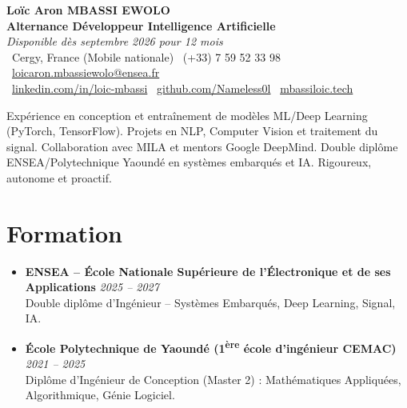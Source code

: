 \documentclass[a4paper,11pt]{article}
\begin{document}
\begin{center}
    {\Large \textbf{Loïc Aron MBASSI EWOLO}} \\ \vspace{4pt}
    \textbf{\large Alternance Développeur Intelligence Artificielle} \\
    \textit{\small Disponible dès septembre 2026 pour 12 mois} \\ \vspace{4pt}
    \small
    \faMapMarker\ Cergy, France (Mobile nationale) \quad
    \faPhone\ (+33) 7 59 52 33 98 \quad
    {\color{primary}\faEnvelope\ \href{mailto:loicaron.mbassiewolo@ensea.fr}{loicaron.mbassiewolo@ensea.fr}} \\ \vspace{2pt}
    {\color{primary}\faLinkedin\ \href{https://www.linkedin.com/in/loic-mbassi/}{linkedin.com/in/loic-mbassi}} \quad
    {\color{primary}\faGithub\ \href{https://github.com/Nameless0l}{github.com/Nameless0l}} \quad
    {\color{primary}\faGlobe\ \href{https://mbassiloic.tech}{mbassiloic.tech}}
\end{center}

\vspace{-6pt}

\noindent\small{Expérience en conception et entraînement de modèles ML/Deep Learning (PyTorch, TensorFlow). Projets en NLP, Computer Vision et traitement du signal. Collaboration avec MILA et mentors Google DeepMind. Double diplôme ENSEA/Polytechnique Yaoundé en systèmes embarqués et IA. Rigoureux, autonome et proactif.}

\section{Formation}
\begin{itemize}[leftmargin=*, label=\tiny$\bullet$, nosep]
    \item \textbf{ENSEA -- École Nationale Supérieure de l'Électronique et de ses Applications} \hfill \textit{2025 -- 2027} \\
    \small{Double diplôme d'Ingénieur -- Systèmes Embarqués, Deep Learning, Signal, IA.}
    \item \textbf{École Polytechnique de Yaoundé (1\textsuperscript{ère} école d'ingénieur CEMAC)} \hfill \textit{2021 -- 2025} \\
    \small{Diplôme d'Ingénieur de Conception (Master 2) : Mathématiques Appliquées, Algorithmique, Génie Logiciel.}
\end{itemize}
\end{document}
